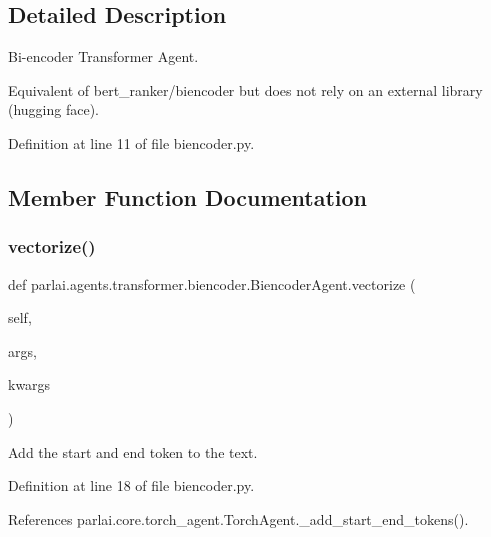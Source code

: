 \subsection{Detailed Description}
\begin{DoxyVerb}Bi-encoder Transformer Agent.

Equivalent of bert_ranker/biencoder but does not rely on an external
library (hugging face).
\end{DoxyVerb}
 

Definition at line 11 of file biencoder.\+py.



\subsection{Member Function Documentation}
\mbox{\label{classparlai_1_1agents_1_1transformer_1_1biencoder_1_1BiencoderAgent_a0a75b68e9e6877358245f85bcb438d03}} 
\subsubsection{\texorpdfstring{vectorize()}{vectorize()}}
{\footnotesize\ttfamily def parlai.\+agents.\+transformer.\+biencoder.\+Biencoder\+Agent.\+vectorize (\begin{DoxyParamCaption}\item[{}]{self,  }\item[{}]{args,  }\item[{}]{kwargs }\end{DoxyParamCaption})}

\begin{DoxyVerb}Add the start and end token to the text.\end{DoxyVerb}
 

Definition at line 18 of file biencoder.\+py.



References parlai.\+core.\+torch\+\_\+agent.\+Torch\+Agent.\+\_\+add\+\_\+start\+\_\+end\+\_\+tokens().

